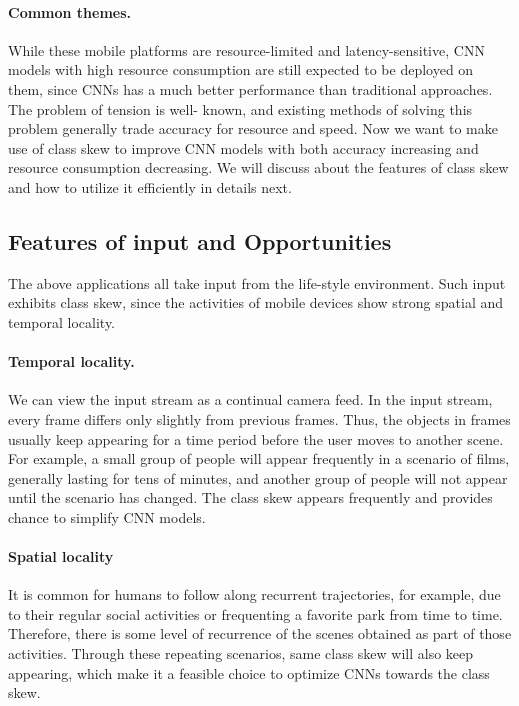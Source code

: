 \documentclass[pageno]{jpaper}
\begin{document}
\paragraph{Common themes.} While these mobile platforms are resource-limited and latency-sensitive, CNN models with high resource consumption are still expected to be deployed on them, since CNNs has a much better performance than traditional approaches. The problem of tension is well- known, and existing methods of solving this problem generally trade accuracy for resource and speed. Now we want to make use of class skew to improve CNN models with both accuracy increasing and resource consumption decreasing. We will discuss about the features of class skew and how to utilize it efficiently in details next.

\subsection{Features of input and Opportunities}
The above applications all take input from the life-style environment. Such input exhibits class skew, since the activities of mobile devices show strong spatial and temporal locality. 

\paragraph{Temporal locality.} We can view the input stream as a continual camera feed. In the input stream, every frame differs only slightly from previous frames. Thus, the objects in frames usually keep appearing for a time period before the user moves to another scene. For example, a small group of people will appear frequently in a scenario of films, generally lasting for tens of minutes, and another group of people will not appear until the scenario has changed. The class skew appears frequently and provides chance to simplify CNN models. 

\paragraph{Spatial locality} It is common for humans to follow along recurrent trajectories, for example, due to their regular social activities or frequenting a favorite park from time to time. Therefore, there is some level of recurrence of the scenes obtained as part of those activities. Through these repeating scenarios, same class skew will also keep appearing, which make it a feasible choice to optimize CNNs towards the class skew.
\end{document}
